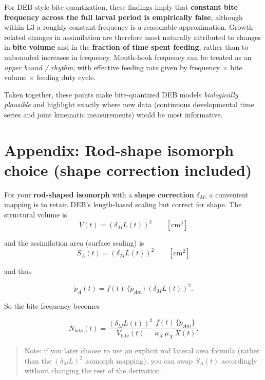 \documentclass[11pt]{article}
\begin{document}
For DEB-style bite quantization, these findings imply that \textbf{constant bite frequency across the full larval period is empirically false}, although within L3 a roughly constant frequency is a reasonable approximation. Growth-related changes in assimilation are therefore most naturally attributed to changes in \textbf{bite volume} and in the \textbf{fraction of time spent feeding}, rather than to unbounded increases in frequency. Mouth-hook frequency can be treated as an \textit{upper bound / rhythm}, with effective feeding rate given by frequency $\times$ bite volume $\times$ feeding duty cycle.

Taken together, these points make bite-quantized DEB models \textit{biologically plausible} and highlight exactly where new data (continuous developmental time series and joint kinematic measurements) would be most informative.

\appendix
\section*{Appendix: Rod-shape isomorph choice (shape correction included)}
For your \textbf{rod-shaped isomorph} with a \textbf{shape correction} \(\delta_M\), a convenient mapping is to retain DEB's length-based scaling but correct for shape. The structural volume is
\begin{equation}
V(t) = (\delta_M L(t))^3
\qquad [\mathrm{cm^3}]
\end{equation}

and the assimilation area (surface scaling) is
\begin{equation}
S_A(t) = (\delta_M L(t))^2
\qquad [\mathrm{cm^2}]
\end{equation}

and thus

\begin{equation}
\dot p_A(t) = f(t)\,\{\dot p_{Am}\}\,(\delta_M L(t))^2.
\end{equation}

So the bite frequency becomes

\begin{equation}
\boxed{
\dot N_{\text{bite}}(t)
=
\frac{(\delta_M L(t))^2}{V_{\text{bite}}(t)}\,
\frac{f(t)\,\{\dot p_{Am}\}}{\kappa_X\,\mu_X\,X(t)}
}.
\end{equation}

\begin{quote}
Note: if you later choose to use an explicit rod lateral area formula (rather than the \((\delta_M L)^2\) isomorph mapping), you can swap \(S_A(t)\) accordingly without changing the rest of the derivation.
\end{quote}




\end{document}
